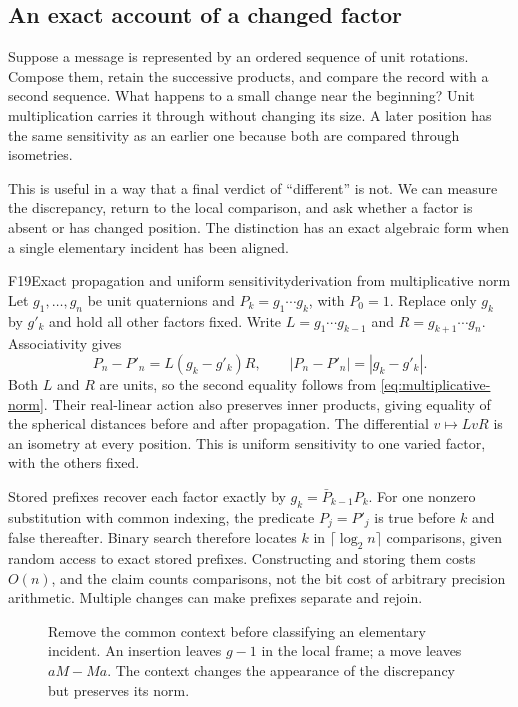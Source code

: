 \documentclass[11pt,a4paper]{article}
\begin{document}
\subsection{An exact account of a changed factor}
Suppose a message is represented by an ordered sequence of unit rotations.
Compose them, retain the successive products, and compare the record with a
second sequence. What happens to a small change near the beginning? Unit
multiplication carries it through without changing its size. A later position
has the same sensitivity as an earlier one because both are compared through
isometries.

This is useful in a way that a final verdict of ``different'' is not. We can
measure the discrepancy, return to the local comparison, and ask whether a
factor is absent or has changed position. The distinction has an exact
algebraic form when a single elementary incident has been aligned.

\begin{formal}{F19}{Exact propagation and uniform sensitivity}{derivation from multiplicative norm}
Let $g_1,\ldots,g_n$ be unit quaternions and
$P_k=g_1\cdots g_k$, with $P_0=1$. Replace only $g_k$ by $g'_k$ and
hold all other factors fixed. Write $L=g_1\cdots g_{k-1}$ and
$R=g_{k+1}\cdots g_n$. Associativity gives
\begin{equation}\label{eq:propagation}
 P_n-P'_n=L(g_k-g'_k)R,\qquad
 |P_n-P'_n|=|g_k-g'_k|.
\end{equation}
Both $L$ and $R$ are units, so the second equality follows from
\eqref{eq:multiplicative-norm}. Their real-linear action also preserves inner
products, giving equality of the spherical distances before and after
propagation. The differential $v\mapsto LvR$ is an isometry at every position.
This is uniform sensitivity to one varied factor, with the others fixed.

Stored prefixes recover each factor exactly by
$g_k=\bar P_{k-1}P_k$. For one nonzero substitution with common indexing,
the predicate $P_j=P'_j$ is true before $k$ and false thereafter. Binary
search therefore locates $k$ in $\lceil\log_2n\rceil$ comparisons, given
random access to exact stored prefixes. Constructing and storing them costs
$O(n)$, and the claim counts comparisons, not the bit cost of arbitrary
precision arithmetic. Multiple changes can make prefixes separate and rejoin.
\end{formal}

\begin{figure}[htbp]
\centering

\caption{Remove the common context before classifying an elementary incident.
An insertion leaves $g-1$ in the local frame; a move leaves $aM-Ma$. The
context changes the appearance of the discrepancy but preserves its norm.}
\label{fig:local}
\end{figure}
\end{document}
